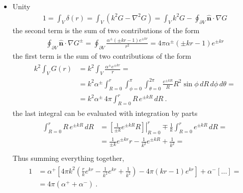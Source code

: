 \documentclass[letterpaper,10pt,italian]{jupyterBook}
\begin{document}
\begin{itemize}
\item {} 
\sphinxAtStartPar
Unity
\begin{equation*}
\begin{split}1 = \int_{V} \delta(r) = \int_V \left( k^2 G - \nabla^2 G \right) = \int_V k^2 G - \oint_{\partial V} \hat{\mathbf{n}} \cdot \nabla G \end{split}
\end{equation*}
\sphinxAtStartPar
the second term is the sum of two contributions of the form
\begin{equation*}
\begin{split}\oint_{\partial V} \hat{\mathbf{n}} \cdot \nabla G^{\pm} = \oint_{\partial V} \frac{\alpha^{\pm}(\pm k r - 1) e^{\pm k r}}{r^2} = 4 \pi \alpha^{\pm} (\pm k r - 1) e^{\pm k r}\end{split}
\end{equation*}
\sphinxAtStartPar
the first term is the sum of two contributions of the form
\begin{equation*}
\begin{split}\begin{aligned}
    k^2 \int_{V} G(r)
      & = k^2 \int_{V} \frac{\alpha^{\pm} e^{\pm k r}}{r} = \\
      & = k^2 \alpha^{\pm} \int_{R = 0}^{r} \int_{\phi=0}^{\pi} \int_{\theta=0}^{2 \pi} \frac{e^{\pm k R}}{R} R^2 \sin \phi \, dR \, d \phi \, d \theta = \\
      & = k^2 \alpha^{\pm} \, 4 \pi \int_{R = 0}^{r} R \, e^{\pm k R} \, dR \ .
  \end{aligned}\end{split}
\end{equation*}
\sphinxAtStartPar
the last integral can be evaluated with integration by parts
\begin{equation*}
\begin{split}\begin{aligned}
    \int_{R = 0}^{r} R \, e^{\pm k R} \, dR
    & = \left.\left[ \frac{1}{\pm k} e^{\pm k R } R \right]\right|_{R=0}^{r} \mp \frac{1}{k} \int_{R=0}^{r} e^{\pm k R} \, dR = \\
    & = \frac{1}{\pm k} e^{\pm k r } r  - \frac{1}{k^2} e^{\pm k R} + \frac{1}{k^2} = \\
  \end{aligned}\end{split}
\end{equation*}
\sphinxAtStartPar
Thus summing everything together,
\begin{equation*}
\begin{split}\begin{aligned}
    1 & = \alpha^+ \left[ 4 \pi k^2 \left( \frac{r}{k} e^{k r} - \frac{1}{k^2} e^{kr} + \frac{1}{k^2} \right) - 4 \pi \left( k r - 1 \right) e^{kr} \right] + \alpha^- \left[ \dots \right] = \\
      & = 4 \pi \left( \alpha^+ + \alpha^- \right) \ .
  \end{aligned}\end{split}
\end{equation*}
\end{itemize}
\end{document}
